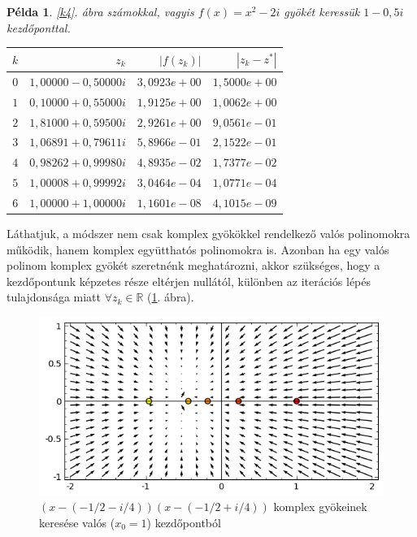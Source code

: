 \documentclass[a4paper,12pt]{report}
\newtheorem{Pl}[Tet]{Példa}
\begin{document}
			\begin{Pl}
				\ref{k4}. ábra számokkal, vagyis $f(x)=x^2-2i$ gyökét keressük $1-0,\!5i$ kezdőponttal.
				\begin{center}
					\begin{tabular}{|r|r|r|r|}
						\hline
						$k$ & $z_k$                & $|f(z_k)|$    & $|z_k-z^*|$  \\ \hline
						$0$ & $1,\!00000 - 0,\!50000i$ & $3,\!0923e+00$  & $1,\!5000e+00$ \\ 
						$1$ & $0,\!10000 + 0,\!55000i$ & $1,\!9125e+00$  & $1,\!0062e+00$ \\ 
						$2$ & $1,\!81000 + 0,\!59500i$ & $2,\!9261e+00$  & $9,\!0561e-01$ \\ 
						 $3$ & $1,\!06891 + 0,\!79611i$ & $5,\!8966e-01$  & $2,\!1522e-01$ \\ 
						$4$ & $0,\!98262 + 0,\!99980i$ & $4,\!8935e-02$  & $1,\!7377e-02$ \\ 
						$5$ & $1,\!00008 + 0,\!99992i$ & $3,\!0464e-04$  & $1,\!0771e-04$ \\ 
						$6$ & $1,\!00000 + 1,\!00000i$ & $1,\!1601e-08$  & $4,\!1015e-09$ \\
						\hline
					\end{tabular}
				\end{center}
			\end{Pl}
			Láthatjuk, a módszer nem csak komplex gyökökkel rendelkező valós polinomokra működik, hanem komplex együtthatós polinomokra is. Azonban ha egy valós polinom komplex gyökét szeretnénk meghatározni, akkor szükséges, hogy a kezdőpontunk képzetes része eltérjen nullától, különben az iterációs lépés tulajdonsága miatt $\forall z_k\in \mathbb{R}$ (\ref{k5}. ábra).
			
			\begin{figure}[ht]
				\begin{center}
				\includegraphics[scale=0.62]{kep5.png}
				\caption{$(x-( - 1/2-i/4)) (x-( - 1/2+i/4))$ komplex gyökeinek keresése valós ($x_0=1$) kezdőpontból} \label{k5}
				\end{center}
			\end{figure}
			
\end{document}
